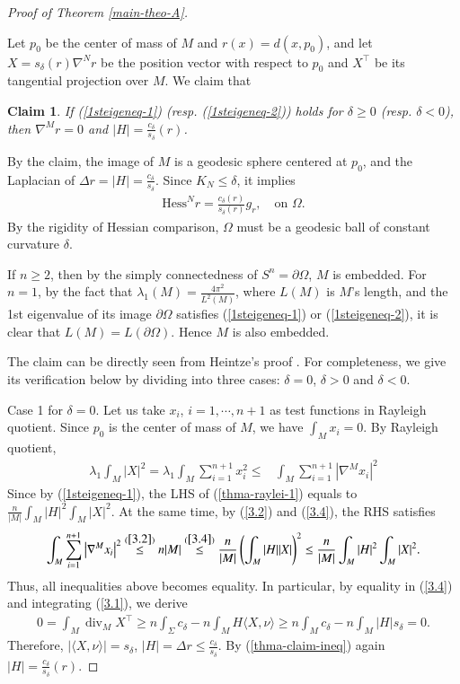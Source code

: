 \documentclass{amsart}
\numberwithin{equation}{section}
\newtheorem{claim}[theo]{Claim}
\theoremstyle{remark}
\renewcommand{\(}{\left(}
\renewcommand{\)}{\right)}
\renewcommand{\~}{\tilde}
\renewcommand{\-}{\overline}
\renewcommand{\d}{\delta}
\renewcommand{\l}{\lambda}
\newcommand{\mrm}{\mathrm}
\newcommand{\divv}{\operatorname{div }}
\begin{document}
\begin{proof}[Proof of Theorem \ref{main-theo-A}]
	~
	
	Let $p_0$ be the center of mass of $M$ and $r(x)=d(x,p_0)$, and let $X=s_\d(r)\nabla^N r$ be the position vector with respect to $p_0$ and $X^\top$ be its tangential projection over $M$.
	We claim that
	
	\begin{claim}
		If (\ref{1steigeneq-1}) (resp. (\ref{1steigeneq-2})) holds for $\d\ge 0$ (resp. $\d<0$), then  $\nabla^M r=0$ and $|H|=\frac{c_\d}{s_\d}(r)$.
	\end{claim}
	
	By the claim, the image of $M$ is a geodesic sphere centered at $p_0$, and the Laplacian of $\Delta r=|H|=\frac{c_\d}{s_\d}$. Since $K_N\le \d$, it implies
	\begin{align*}
	\mrm{Hess}^N r=\frac{c_\d(r)}{s_\d(r)}g_r, \quad \text{on $\Omega$}.
	\end{align*}
	By the rigidity of Hessian comparison, $\Omega$ must be a geodesic ball of constant curvature $\d$.
	
	If $n\ge2$, then by the simply connectedness of $S^n=\partial \Omega$, $M$ is embedded. For $n=1$, by the fact that $\lambda_1(M)=\frac{4\pi^2}{L^2(M)}$, where $L(M)$ is $M$'s length, and the 1st eigenvalue of its image $\partial \Omega$ satisfies (\ref{1steigeneq-1}) or (\ref{1steigeneq-2}), it is clear that $L(M)=L(\partial \Omega)$. Hence $M$ is also embedded.
	
	The claim can be directly seen from Heintze's proof \cite{Heintze1988}. For completeness, we give its verification below by dividing into three cases: $\d=0$, $\d>0$ and $\d<0$.
	
	Case 1 for $\d=0$. Let us take $x_i$, $i=1,\cdots,n+1$ as test functions in Rayleigh quotient. Since $p_0$ is the center of mass of $M$, we have $\int_{M}x_i=0$. By Rayleigh quotient,
	\begin{align}\label{thma-raylei-1}
	\l_1 \int_M |X|^2=\l_1 \int_M \sum_{i=1}^{n+1}x_i^2 \leq & \int_M \sum_{i=1}^{n+1}\left|\nabla^M x_i\right|^2
	\end{align}
	Since by (\ref{1steigeneq-1}), the LHS of (\ref{thma-raylei-1}) equals to $\frac{n}{|M|}\int_M |H|^2 \int_M |X|^2$. At the same time, by (\ref{3.2}) and (\ref{3.4}), the RHS satisfies
	\begin{align*}
	\int_M \sum_{i=1}^{n+1}\left|\nabla^M x_i\right|^2
	\overset{(\ref{3.2})}\leq  n|M| \overset{(\ref{3.4})}\leq \frac{n}{|M|}\(\int_M |H||X|\)^2
	\leq \frac{n}{|M|}\int_M |H|^2 \int_M |X|^2.
	\end{align*}
	Thus, all inequalities above becomes equality. In particular, by equality in (\ref{3.4}) and integrating (\ref{3.1}), we derive
	\begin{align}\label{thma-claim-ineq}
	0=\int_{M}\divv_M X^\top \geq n\int_{\Sigma} c_\d - n \int_M H\langle X,\nu \rangle\geq n \int_M c_\d-n\int_M |H|s_\d =0.
	\end{align}
	Therefore, $|\langle X,\nu \rangle|=s_\d$, $|H|=\Delta r\le \frac{c_\d}{s_\d}$. By (\ref{thma-claim-ineq}) again $|H|=\frac{c_\d}{s_\d}(r)$.
	

\end{proof}
\end{document}
